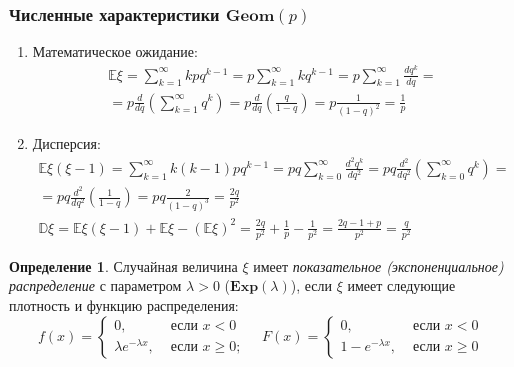 \documentclass[oneside,final,14pt]{extreport}
\theoremstyle{plain}
\theoremstyle{definition}
\newtheorem*{defn}{Определение}
\theoremstyle{named}
\begin{document}
\subsubsection{Численные характеристики $\mathbf{Geom}(p)$}
\begin{enumerate}
    \item Математическое ожидание:
    \begin{multline*}
        \mathbb{E} \xi=\sum\limits_{k=1}^{\infty} k p q^{k-1}=p \sum\limits_{k=1}^{\infty} k q^{k-1}=p \sum\limits_{k=1}^{\infty} \frac{d q^{k}}{d q} = \\
        = p \frac{d}{d q}\left(\sum\limits_{k=1}^{\infty} q^{k}\right)=p \frac{d}{d q}\left(\frac{q}{1-q}\right)=p \frac{1}{(1-q)^{2}}=\frac{1}{p}
    \end{multline*}
    \item Дисперсия:
    \begin{multline*}
        \mathbb{E} \xi(\xi-1)=\sum\limits_{k=1}^{\infty} k(k-1) p q^{k-1}=p q \sum\limits_{k=0}^{\infty} \frac{d^{2} q^{k}}{d q^{2}} =p q \frac{d^{2}}{d q^{2}}\left(\sum\limits_{k=0}^{\infty} q^{k}\right) = \\
        =p q \frac{d^{2}}{d q^{2}}\left(\frac{1}{1-q}\right)=p q \frac{2}{(1-q)^{3}}=\frac{2 q}{p^{2}} \\
        \mathbb{D} \xi=\mathbb{E} \xi(\xi-1)+\mathbb{E} \xi-(\mathbb{E} \xi)^{2}=\frac{2 q}{p^{2}}+\frac{1}{p}-\frac{1}{p^{2}}=\frac{2 q-1+p}{p^{2}}=\frac{q}{p^{2}}
    \end{multline*}
\end{enumerate}

\begin{defn}
    Случайная величина $\xi$ имеет {\it показательное (экспоненциальное) распределение} с параметром $\lambda > 0$ ($\mathbf{Exp}(\lambda)$), если $\xi$ имеет следующие плотность и функцию распределения:
    \begin{equation*}
        f(x)=\left\{\begin{array}{ll}
        0, & \text { если } x<0 \\
        \lambda e^{-\lambda x}, & \text { если } x \geqslant 0 ;
        \end{array}\right. \quad F(x)=\left\{\begin{array}{cc}
        0, & \text { если } x<0 \\
        1-e^{-\lambda x}, & \text { если } x \geqslant 0
        \end{array}\right.
    \end{equation*}
\end{defn}
\end{document}

